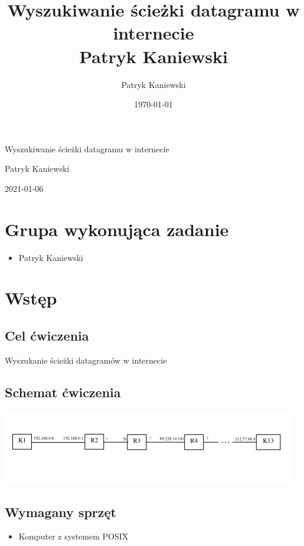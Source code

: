 \documentclass[11pt]{article}
\author{Patryk Kaniewski}
\date{\today}
\title{Wyszukiwanie ścieżki datagramu w internecie \\
Patryk Kaniewski}
\begin{document}
\begin{titlepage}
\begin{center}
{\Huge Wyszukiwanie ścieżki datagramu w internecie \par}
\vspace{2cm}
{\Large Patryk Kaniewski \par
}\vspace{2cm}
{\large 2021-01-06 }
\end{center}
\end{titlepage}
\setcounter{tocdepth}{2}
\tableofcontents \clearpage

\section{Grupa wykonująca zadanie}
\label{sec:orgce243a4}
\begin{itemize}
\item Patryk Kaniewski
\end{itemize}

\section{Wstęp}
\label{sec:orgcb0c0f5}
\subsection{Cel ćwiczenia}
\label{sec:orgb2521f9}
Wyszukanie ścieżki datagramów w internecie
\subsection{Schemat ćwiczenia}
\label{sec:orgd761593}
\begin{center}
\includegraphics[width=.9\linewidth]{./schemat.png}
\end{center}
\subsection{Wymagany sprzęt}
\label{sec:org815afa8}
\begin{itemize}
\item Komputer z systemem POSIX
\end{itemize}
\end{document}
